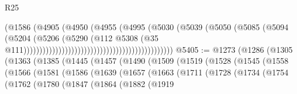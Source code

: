 \begin{lexlean}{R25}
\begin{coremodule}
                                                                    (@1586
                                                                      (@4905
                                                                        (@4950
                                                                          (@4955
                                                                            (@4995
                                                                              (@5030
                                                                                (@5039
                                                                                  (@5050
                                                                                    (@5085
                                                                                      (@5094
                                                                                        (@5204
                                                                                          (@5206
                                                                                            (@5290
                                                                                              (@112
                                                                                                @5308
                                                                                                (@35
                                                                                                  @111)))))))))))))))))))))))))))))))))))))))))))))))
@5405 := @1273
    (@1286
      (@1305
        (@1363
          (@1385
            (@1445
              (@1457
                (@1490
                  (@1509
                    (@1519
                      (@1528
                        (@1545
                          (@1558
                            (@1566
                              (@1581
                                (@1586
                                  (@1639
                                    (@1657
                                      (@1663
                                        (@1711
                                          (@1728
                                            (@1734
                                              (@1754
                                                (@1762
                                                  (@1780
                                                    (@1847
                                                      (@1864
                                                        (@1882
                                                          (@1919

\end{coremodule}
\end{lexlean}
